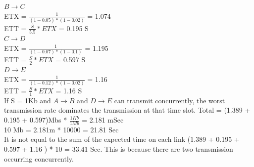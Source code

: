 \documentclass[12pt]{article}
\begin{document}
\begin{enumerate}
$B\rightarrow C$\\
ETX = $\frac{1}{(1-0.05)*(1-0.02)}$ = 1.074\\
ETT = $\frac{S}{5.5} * ETX $ = 0.195 S\\

$C\rightarrow D$\\
ETX = $\frac{1}{(1-0.07)*(1-0.1)}$ = 1.195\\
ETT = $\frac{S}{2} * ETX $ = 0.597 S\\

$D\rightarrow E$\\
ETX = $\frac{1}{(1-0.12)*(1-0.02)}$ = 1.16\\
ETT = $\frac{S}{1} * ETX $ = 1.16 S\\

If S = 1Kb and $A\rightarrow B$ and $D\rightarrow E$ can transmit concurrently, the worst transmission rate dominates the transmission at that time slot.
Total = (1.389 + 0.195 + 0.597)Mbs * $\frac{1 Kb}{1 Mb}$ = 2.181 mSec\\
10 Mb = 2.181m * 10000 = 21.81 Sec\\
It is not equal to the sum of the expected time on each link (1.389 + 0.195 + 0.597 + 1.16 ) * 10 = 33.41 Sec. This is because there are two transmission occurring concurrently.
\end{enumerate}
\end{document}
